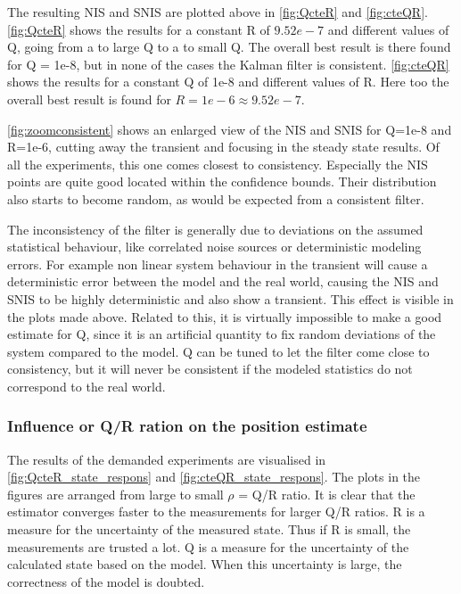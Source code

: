 \documentclass[a4paper]{article}
\newcommand{\newpar}{\vspace{.3cm}\noindent}
\begin{document}
\newpar
The resulting NIS and SNIS are plotted above in \autoref{fig:QcteR} and \autoref{fig:cteQR}. \autoref{fig:QcteR} shows the results for a constant R of $9.52e-7$ and different values of Q, going from a to large Q to a to small Q. The overall best result is there found for Q = 1e-8, but in none of the cases the Kalman filter is consistent. \autoref{fig:cteQR} shows the results for a constant Q of 1e-8 and different values of R. Here too the overall best result is found for $R = 1e-6 \approx 9.52e-7$. 

\newpar
\autoref{fig:zoomconsistent} shows an enlarged view of the NIS and SNIS for Q=1e-8 and R=1e-6, cutting away the transient and focusing in the steady state results. Of all the experiments, this one comes closest to consistency. Especially the NIS points are quite good located within the confidence bounds. Their distribution also starts to become random, as would be expected from a consistent filter.

\newpar
The inconsistency of the filter is generally due to deviations on the assumed statistical behaviour, like correlated noise sources or deterministic modeling errors. For example non linear system behaviour in the transient will cause a deterministic error between the model and the real world, causing the NIS and SNIS to be highly deterministic and also show a transient. This effect is visible in the plots made above. Related to this, it is virtually impossible to make a good estimate for Q, since it is an artificial quantity to fix random deviations of the system compared to the model. Q can be tuned to let the filter come close to consistency, but it will never be consistent if the modeled statistics do not correspond to the real world. 


\subsubsection{Influence or Q/R ration on the position estimate}
The results of the demanded experiments are visualised in \autoref{fig:QcteR_state_respons} and \autoref{fig:cteQR_state_respons}. The plots in the figures are arranged from large to small $\rho$ = Q/R ratio. It is clear that the estimator converges faster to the measurements for larger Q/R ratios. R is a measure for the uncertainty of the measured state. Thus if R is small, the measurements are trusted a lot. Q is a measure for the uncertainty of the calculated state based on the model. When this uncertainty is large, the correctness of the model is doubted. 
\end{document}
